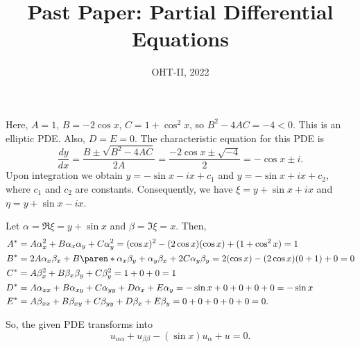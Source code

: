 \documentclass[11pt]{penrose}
\title{Past Paper: Partial Differential Equations}
\subtitle{OHT-II, 2022}
\begin{document}
\maketitle
\warningtext

\begin{problem}{1}
    
    Here, $A = 1$, $B = -2 \cos x$, $C = 1 + \cos^2 x$, so $B^2 - 4AC = -4 < 0$. This is an elliptic PDE. Also, $D = E = 0$. The characteristic equation for this PDE is
    \begin{equation*}
        \frac{dy}{dx} = \frac{B \pm \sqrt{B^2 - 4AC}}{2A} = \frac{-2\cos x \pm \sqrt{-4}}{2} = - \cos x \pm i.
    \end{equation*}
    Upon integration we obtain $y = -\sin x - i x + c_1$ and $y = -\sin x + i x + c_2$, where $c_1$ and $c_2$ are constants. Consequently, we have $\xi = y + \sin x + ix$ and $\eta = y + \sin x - ix$.

    Let $\alpha = \Re\xi = y + \sin x$ and $\beta = \Im\xi = x$. Then,
    \begin{align*}
        A^{*} &= A \alpha_x^2 + B \alpha_x \alpha_y + C \alpha_y^2 = (\cos x)^2 - (2 \cos x) (\cos x) + (1 + \cos^2 x) = 1\\
        B^{*} &= 2A\alpha_x \beta_x + B \paren*{\alpha_x \beta_y + \alpha_y \beta_x} + 2C \alpha_y \beta_y = 2 (\cos x) - (2 \cos x)(0+1) + 0 = 0\\
        C^{*} &= A \beta_x^2 + B \beta_x \beta_y + C \beta_y^2 = 1 + 0 + 0 = 1\\
        D^{*} &= A \alpha_{xx} + B \alpha_{xy} + C \alpha_{yy} + D \alpha_{x} + E \alpha_{y} = -\sin x + 0 + 0 + 0 + 0 = -\sin x\\
        E^{*} &= A \beta_{xx} + B \beta_{xy} + C \beta_{yy} + D \beta_{x} + E \beta_{y} = 0 + 0 + 0 + 0 + 0 = 0.
    \end{align*}

    So, the given PDE transforms into
    \begin{equation*}
        u_{\alpha\alpha} + u_{\beta\beta} - (\sin x) u_{\alpha} + u = 0.
    \end{equation*}
\end{problem}

    
\end{document}
